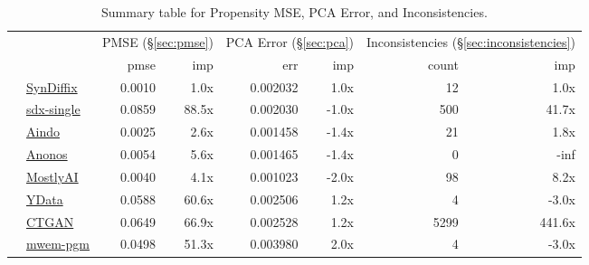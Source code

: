 \begin{table}
    \centering
    \caption{Summary table for Propensity MSE, PCA Error, and Inconsistencies.}
    \label{tab:pmse}
    \begin{tabular}{llr@{\hskip 6pt}r@{\hskip 14pt}r@{\hskip 6pt}r@{\hskip 14pt}rr}
        \toprule
          &   & \multicolumn{2}{c}{PMSE (\S\ref{sec:pmse})} & \multicolumn{2}{c}{PCA Error (\S\ref{sec:pca})} & \multicolumn{2}{c}{Inconsistencies (\S\ref{sec:inconsistencies})} \\
        
 & & pmse & imp & err & imp & count & imp \\
\midrule
        \cellcolor{blue} & \href{https://htmlpreview.github.io/?https://github.com/yoid2000/sdnist-summary/blob/main/results/syndiffix_all/report.html}{SynDiffix} & 0.0010 & 1.0x & 0.002032 & 1.0x & 12 & 1.0x \\
        \cellcolor{blue} & \href{https://htmlpreview.github.io/?https://github.com/yoid2000/sdnist-summary/blob/main/results/sdx_single/report.html}{sdx-single} & 0.0859 & 88.5x & 0.002030 & -1.0x & 500 & 41.7x \\
        \cellcolor{red} & \href{https://htmlpreview.github.io/?https://github.com/yoid2000/sdnist-summary/blob/main/results/aindo_synth/report.html}{Aindo} & 0.0025 & 2.6x & 0.001458 & -1.4x & 21 & 1.8x \\
        \cellcolor{red} & \href{https://htmlpreview.github.io/?https://github.com/yoid2000/sdnist-summary/blob/main/results/anonos_sdk/report.html}{Anonos} & 0.0054 & 5.6x & 0.001465 & -1.4x & 0 & -inf \\
        \cellcolor{red} & \href{https://htmlpreview.github.io/?https://github.com/yoid2000/sdnist-summary/blob/main/results/mostlyai_sd_platform/report.html}{MostlyAI} & 0.0040 & 4.1x & 0.001023 & -2.0x & 98 & 8.2x \\
        \cellcolor{red} & \href{https://htmlpreview.github.io/?https://github.com/yoid2000/sdnist-summary/blob/main/results/ydata_fabric_synthesizers/report.html}{YData} & 0.0588 & 60.6x & 0.002506 & 1.2x & 4 & -3.0x \\
        \cellcolor{red} & \href{https://htmlpreview.github.io/?https://github.com/yoid2000/sdnist-summary/blob/main/results/sdv_ctgan_epochs1000/report.html}{CTGAN} & 0.0649 & 66.9x & 0.002528 & 1.2x & 5299 & 441.6x \\
        \cellcolor{ForestGreen} & \href{https://htmlpreview.github.io/?https://github.com/yoid2000/sdnist-summary/blob/main/results/mwem_pgm/report.html}{mwem-pgm} & 0.0498 & 51.3x & 0.003980 & 2.0x & 4 & -3.0x \\

\end{tabular}
\end{table}
